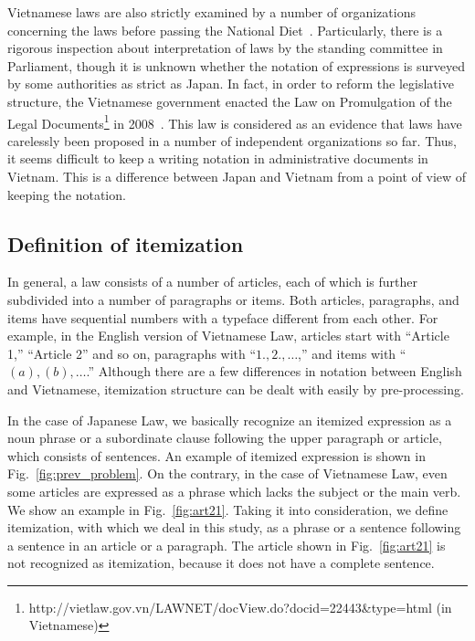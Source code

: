 \documentclass[english]{jnlp_1.4}
\begin{document}
Vietnamese laws are also strictly examined by a number of organizations
concerning the laws before passing the National Diet~\cite{endo07}.
Particularly, there is a rigorous inspection about interpretation of
laws by the standing committee in Parliament, though it is unknown
whether the notation of expressions is surveyed by some authorities as
strict as Japan.
In fact, in order to reform the legislative structure,
the Vietnamese government enacted the Law on Promulgation of the Legal
Documents\footnote{http://vietlaw.gov.vn/LAWNET/docView.do?docid=22443\&type=html
(in Vietnamese)}
in 2008~\cite{endo08}.
This law is considered as an evidence that laws have carelessly been
proposed in a number of independent organizations so far.
Thus, it seems difficult to keep a writing notation in administrative
documents in Vietnam.
This is a difference between Japan and Vietnam from a point of view of
keeping the notation.


\subsection{Definition of itemization}

In general, a law consists of a number of articles, each of which is
further subdivided into a number of paragraphs or items.
Both articles, paragraphs, and items have sequential numbers with
a typeface different from each other.  For example, in the English
version of Vietnamese Law, articles start with ``Article 1,'' ``Article
2'' and so on, paragraphs with ``$1., 2., \ldots$,'' and items with
``$(a), (b), \ldots$.''
Although there are a few differences in notation between English and
Vietnamese, itemization structure can be dealt with easily by pre-processing.


In the case of Japanese Law, we basically recognize an itemized
expression as a noun phrase or a subordinate clause following the upper
paragraph or article, which consists of sentences.
An example of itemized expression is shown in Fig.~\ref{fig:prev_problem}.
On the contrary, in the case of Vietnamese Law, even some articles
are expressed as a phrase which lacks the subject or the main verb.
We show an example in Fig.~\ref{fig:art21}.
Taking it into consideration, we define itemization, with which we deal in this
study, as a phrase or a sentence following a sentence in an article or a
paragraph.
The article shown in Fig.~\ref{fig:art21} is not
recognized as itemization, because it does not have a complete sentence.
\end{document}
